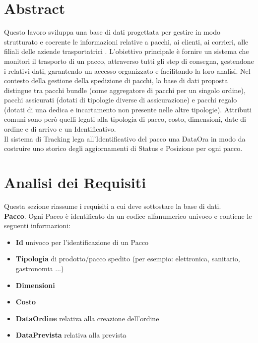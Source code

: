 \section{Abstract}
Questo lavoro sviluppa una base di dati progettata per gestire in modo strutturato e
coerente le informazioni relative a pacchi, ai clienti, ai corrieri, alle filiali delle aziende trasportatrici . L’obiettivo principale è fornire un sistema che monitori il trasporto di un pacco, attraverso tutti gli step di consegna, gestendone i relativi dati, garantendo un accesso organizzato e facilitando la loro analisi.
Nel contesto della gestione della spedizione di pacchi, la base di dati proposta distingue tra pacchi bundle (come aggregatore di pacchi per un singolo ordine), pacchi assicurati (dotati di tipologie diverse di assicurazione) e pacchi regalo (dotati di una dedica e incartamento non presente nelle altre tipologie). 
Attributi comuni sono però quelli legati alla tipologia di pacco, costo, dimensioni, date di ordine e di arrivo e un Identificativo.\\ 
Il sistema di Tracking lega all'Identificativo del pacco una DataOra in modo da costruire uno storico degli aggiornamenti di Status e Posizione per ogni pacco.

\section{Analisi dei Requisiti}
Questa sezione riassume i requisiti a cui deve sottostare la base di dati.\\
\textbf{Pacco}. Ogni Pacco è identificato da un codice alfanumerico univoco e contiene le seguenti
informazioni:\\
\begin{itemize}
    \setlength{\itemindent}{+.5in}
    \item \textbf{Id} univoco per l'identificazione di un Pacco
    \item \textbf{Tipologia} di prodotto/pacco spedito \footnotesize{(per esempio: elettronica, sanitario, gastronomia ...)}
    \item \normalsize{\textbf{Dimensioni}}
    \item \textbf{Costo}
    \item \textbf{DataOrdine} relativa alla creazione dell'ordine
    \item \textbf{DataPrevista} relativa alla prevista 

\end{itemize}

